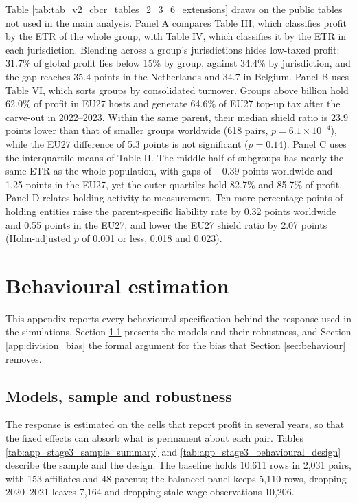 \documentclass[11pt,a4paper]{article}
\newcommand{\EUR}{\texteuro}
\begin{document}


Table \ref{tab:tab_v2_cbcr_tables_2_3_6_extensions} draws on the public tables not used in the main analysis. Panel A compares Table III, which classifies profit by the ETR of the whole group, with Table IV, which classifies it by the ETR in each jurisdiction. Blending across a group's jurisdictions hides low-taxed profit: 31.7\% of global profit lies below 15\% by group, against 34.4\% by jurisdiction, and the gap reaches 35.4 points in the Netherlands and 34.7 in Belgium. Panel B uses Table VI, which sorts groups by consolidated turnover. Groups above \EUR10 billion hold 62.0\% of profit in EU27 hosts and generate 64.6\% of EU27 top-up tax after the carve-out in 2022–2023. Within the same parent, their median shield ratio is 23.9 points lower than that of smaller groups worldwide (618 pairs, $p=6.1\times10^{-4}$), while the EU27 difference of 5.3 points is not significant ($p=0.14$). Panel C uses the interquartile means of Table II. The middle half of subgroups has nearly the same ETR as the whole population, with gaps of $-0.39$ points worldwide and 1.25 points in the EU27, yet the outer quartiles hold 82.7\% and 85.7\% of profit. Panel D relates holding activity to measurement. Ten more percentage points of holding entities raise the parent-specific liability rate by 0.32 points worldwide and 0.55 points in the EU27, and lower the EU27 shield ratio by 2.07 points (Holm-adjusted $p$ of 0.001 or less, 0.018 and 0.023).

\clearpage
\section{Behavioural estimation}\label{app:behaviour}

This appendix reports every behavioural specification behind the response used in the simulations. Section \ref{app:beh_models} presents the models and their robustness, and Section \ref{app:division_bias} the formal argument for the bias that Section \ref{sec:behaviour} removes.

\subsection{Models, sample and robustness}\label{app:beh_models}

The response is estimated on the cells that report profit in several years, so that the fixed effects can absorb what is permanent about each pair. Tables \ref{tab:app_stage3_sample_summary} and \ref{tab:app_stage3_behavioural_design} describe the sample and the design. The baseline holds 10,611 rows in 2,031 pairs, with 153 affiliates and 48 parents; the balanced panel keeps 5,110 rows, dropping 2020–2021 leaves 7,164 and dropping stale wage observations 10,206.
\end{document}
